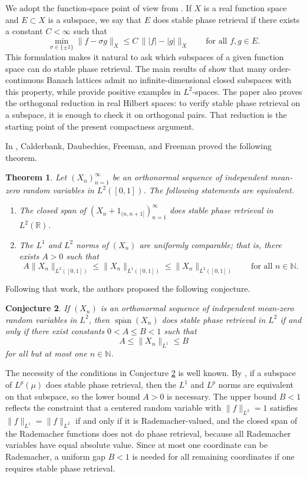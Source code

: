 \documentclass[11pt]{amsart}
\newtheorem{theorem}{Theorem}
\newtheorem{conjecture}[theorem]{Conjecture}
\newcommand{\N}{\mathbb N}
\newcommand{\R}{\mathbb R}
\newcommand{\Span}{\operatorname{span}}
\begin{document}
We adopt the function-space point of view from \cite{FOTP}. If $X$ is a real
function space and $E \subset X$ is a subspace, we say that $E$ does stable
phase retrieval if there exists a constant $C < \infty$ such that
\[
\min_{\sigma \in \{\pm 1\}} \|f-\sigma g\|_X
\leq C \, \bigl\||f|-|g|\bigr\|_X
\qquad
\text{for all } f,g \in E.
\]
This formulation makes it natural to ask which subspaces of a given function
space can do stable phase retrieval. The main results of \cite{FOTP} show that
many order-continuous Banach lattices admit no infinite-dimensional closed subspaces
with this property, while \cite{christ2022examples,FOTP} provide positive
examples in $L^2$-spaces. The paper \cite{FOTP} also proves the orthogonal reduction
in real Hilbert spaces: to verify stable phase retrieval on a subspace, it is
enough to check it on orthogonal pairs. That reduction is the starting point of the present
compactness argument.

In \cite{calderbank2022stable}, Calderbank, Daubechies, Freeman, and Freeman
proved the following theorem.

\begin{theorem}
Let $(X_n)_{n=1}^\infty$ be an orthonormal sequence of independent mean-zero
random variables in $L^2([0,1])$. The following statements are equivalent.
\begin{enumerate}[label=\rm(\arabic*)]
\item The closed span of $(X_n+1_{(n,n+1]})_{n=1}^\infty$ does stable phase
retrieval in $L^2(\R)$.
\item The $L^1$ and $L^2$ norms of $(X_n)$ are uniformly comparable; that is,
there exists $A>0$ such that
\[
A\|X_n\|_{L^2([0,1])}\leq \|X_n\|_{L^1([0,1])}\leq \|X_n\|_{L^2([0,1])}
\qquad
\text{for all } n\in \N.
\]
\end{enumerate}
\end{theorem}

Following that work, the authors proposed the following conjecture.

\begin{conjecture}\label{conj:cdff}
If $(X_n)$ is an orthonormal sequence of independent mean-zero random
variables in $L^2$, then $\overline{\Span}(X_n)$ does stable phase retrieval in $L^2$ if
and only if there exist constants $0<A\leq B<1$ such that
\[
A\leq \|X_n\|_{L^1}\leq B
\]
for all but at most one $n\in \N$.
\end{conjecture}

The necessity of the conditions in Conjecture \ref{conj:cdff} is well
known.
By \cite{FOTP}, if a subspace of $L^p(\mu)$
does stable phase retrieval, then the $L^1$ and $L^p$ norms are equivalent on
that subspace, so the lower bound $A>0$ is necessary. The upper bound $B<1$
reflects the constraint that a centered random variable with
$\|f\|_{L^2}=1$ satisfies
$\|f\|_{L^1}=\|f\|_{L^2}$ if and only if it is Rademacher-valued, and the
closed span of the Rademacher functions does not do phase retrieval,
 because all Rademacher variables have equal absolute value.
Since at most one coordinate can be Rademacher, a uniform gap $B<1$ is needed
for all remaining coordinates if one requires stable phase retrieval. 
\end{document}
